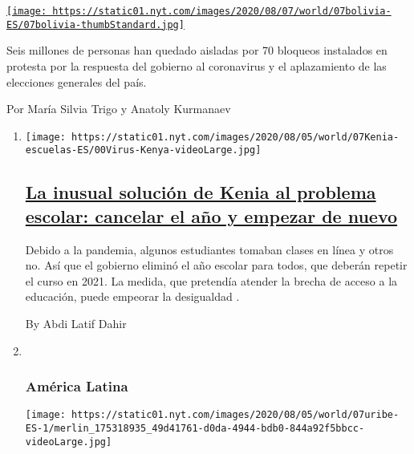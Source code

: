 \begin{enumerate}
\begin{enumerate}
    \href{/es/2020/08/07/espanol/america-latina/bloqueos-bolivia.html}{\texttt{[image: https://static01.nyt.com/images/2020/08/07/world/07bolivia-ES/07bolivia-thumbStandard.jpg]}}

    Seis millones de personas han quedado aisladas por 70 bloqueos
    instalados en protesta por la respuesta del gobierno al coronavirus
    y el aplazamiento de las elecciones generales del país.

    Por María Silvia Trigo y Anatoly Kurmanaev
  \end{enumerate}
\end{enumerate}

\begin{enumerate}
\def\labelenumi{\arabic{enumi}.}
\item
  \texttt{[image: https://static01.nyt.com/images/2020/08/05/world/07Kenia-escuelas-ES/00Virus-Kenya-videoLarge.jpg]}

  \hypertarget{la-inusual-soluciuxf3n-de-kenia-al-problema-escolar-cancelar-el-auxf1o-y-empezar-de-nuevo}{%
  \subsection{\texorpdfstring{\href{/es/2020/08/07/espanol/mundo/cierre-escuela-coronavirus-kenia.html}{La
  inusual solución de Kenia al problema escolar: cancelar el año y
  empezar de
  nuevo}}{La inusual solución de Kenia al problema escolar: cancelar el año y empezar de nuevo}}\label{la-inusual-soluciuxf3n-de-kenia-al-problema-escolar-cancelar-el-auxf1o-y-empezar-de-nuevo}}

  Debido a la pandemia, algunos estudiantes tomaban clases en línea y
  otros no. Así que el gobierno eliminó el año escolar para todos, que
  deberán repetir el curso en 2021. La medida, que pretendía atender la
  brecha de acceso a la educación, puede empeorar la desigualdad .

  By Abdi Latif Dahir
\item ~
  \hypertarget{amuxe9rica-latina}{%
  \subsubsection{América Latina}\label{amuxe9rica-latina}}

  \texttt{[image: https://static01.nyt.com/images/2020/08/05/world/07uribe-ES-1/merlin\_175318935\_49d41761-d0da-4944-bdb0-844a92f5bbcc-videoLarge.jpg]}

  \hypertarget{la-detenciuxf3n-de-uxe1lvaro-uribe-profundiza-las-divisiones-de-colombia}{%
}
\end{enumerate}
